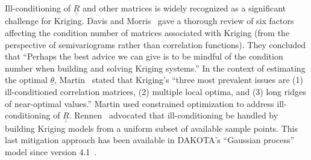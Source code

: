 \documentclass{article}
\begin{document}
Ill-conditioning of $\underline{\underline{R}}$ and other matrices is
widely recognized as a significant challenge for Kriging. Davis and
Morris~\cite{davis1997six} gave a thorough review of six factors
affecting the condition number of matrices associated with Kriging
(from the perspective of semivariograms rather than correlation
functions).  They concluded that ``Perhaps the best advice we can give
is to be mindful of the condition number when building and solving
Kriging systems.''  In the context of estimating the optimal
$\underline{\theta}$, Martin~\cite{martin2009computational} stated
that Kriging's ``three most prevalent issues are (1) ill-conditioned
correlation matrices, (2) multiple local optima, and (3) long ridges
of near-optimal values.'' Martin used constrained optimization to
address ill-conditioning of $\underline{\underline{R}}$.
Rennen~\cite{rennen2009subset} advocated that ill-conditioning be
handled by building Kriging models from a uniform subset of available
sample points.  This last mitigation approach has been available in
DAKOTA's ``Gaussian process'' model since version
4.1~\cite{eldred2007dakota}.\newline
\end{document}
